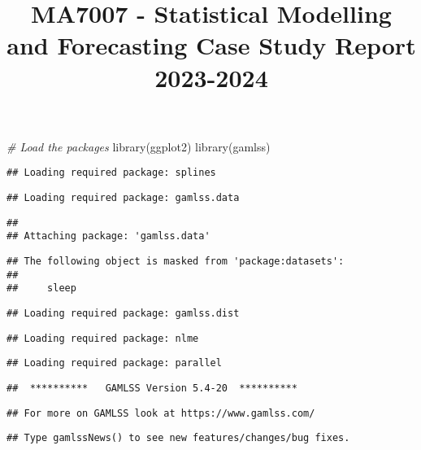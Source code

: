\documentclass[
]{article}
\title{MA7007 - Statistical Modelling and Forecasting Case Study Report
2023-2024}
\author{}
\date{\vspace{-2.5em}}
\newenvironment{Shaded}{\begin{snugshade}}{\end{snugshade}}
\newcommand{\CommentTok}[1]{\textcolor[rgb]{0.56,0.35,0.01}{\textit{#1}}}
\newcommand{\FunctionTok}[1]{\textcolor[rgb]{0.00,0.00,0.00}{#1}}
\newcommand{\NormalTok}[1]{#1}
\begin{document}
\maketitle

\begin{Shaded}
\begin{Highlighting}[]
\CommentTok{\# Load the packages}
\FunctionTok{library}\NormalTok{(ggplot2)}
\FunctionTok{library}\NormalTok{(gamlss)}
\end{Highlighting}
\end{Shaded}

\begin{verbatim}
## Loading required package: splines
\end{verbatim}

\begin{verbatim}
## Loading required package: gamlss.data
\end{verbatim}

\begin{verbatim}
## 
## Attaching package: 'gamlss.data'
\end{verbatim}

\begin{verbatim}
## The following object is masked from 'package:datasets':
## 
##     sleep
\end{verbatim}

\begin{verbatim}
## Loading required package: gamlss.dist
\end{verbatim}

\begin{verbatim}
## Loading required package: nlme
\end{verbatim}

\begin{verbatim}
## Loading required package: parallel
\end{verbatim}

\begin{verbatim}
##  **********   GAMLSS Version 5.4-20  **********
\end{verbatim}

\begin{verbatim}
## For more on GAMLSS look at https://www.gamlss.com/
\end{verbatim}

\begin{verbatim}
## Type gamlssNews() to see new features/changes/bug fixes.
\end{verbatim}
\end{document}
